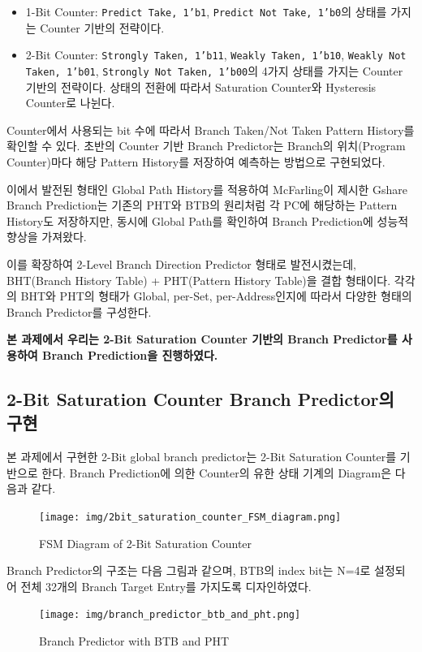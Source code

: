 \documentclass[openright, a4paper]{article}
\newcommand{\code}[1]{\texttt{#1}}
\begin{document}
\begin{itemize}
    \item 1-Bit Counter: \code{Predict Take, 1'b1}, \code{Predict Not Take, 1'b0}의 상태를 가지는 Counter 기반의 전략이다.
    \item 2-Bit Counter: \code{Strongly Taken, 1'b11}, \code{Weakly Taken, 1'b10}, \code{Weakly Not Taken, 1'b01}, \code{Strongly Not Taken, 1'b00}의 4가지 상태를 가지는 Counter 기반의 전략이다. 상태의 전환에 따라서 Saturation Counter와 Hysteresis Counter로 나뉜다.
\end{itemize}

Counter에서 사용되는 bit 수에 따라서 Branch Taken/Not Taken Pattern History를 확인할 수 있다. 초반의 Counter 기반 Branch Predictor는 Branch의 위치(Program Counter)마다 해당 Pattern History를 저장하여 예측하는 방법으로 구현되었다.

이에서 발전된 형태인 Global Path History를 적용하여 McFarling이 제시한 Gshare Branch Prediction는 기존의 PHT와 BTB의 원리처럼 각 PC에 해당하는 Pattern History도 저장하지만, 동시에 Global Path를 확인하여 Branch Prediction에 성능적 향상을 가져왔다.

이를 확장하여 2-Level Branch Direction Predictor 형태로 발전시켰는데, BHT(Branch History Table) + PHT(Pattern History Table)을 결합 형태이다. 각각의 BHT와 PHT의 형태가 Global, per-Set, per-Address인지에 따라서 다양한 형태의 Branch Predictor를 구성한다.

\textbf{본 과제에서 우리는 2-Bit Saturation Counter 기반의 Branch Predictor를 사용하여 Branch Prediction을 진행하였다.}

\subsection{2-Bit Saturation Counter Branch Predictor의 구현}

본 과제에서 구현한 2-Bit global branch predictor는 2-Bit Saturation Counter를 기반으로 한다. Branch Prediction에 의한 Counter의 유한 상태 기계의 Diagram은 다음과 같다.

\begin{figure}[h]
    \centering
    \texttt{[image: img/2bit\_saturation\_counter\_FSM\_diagram.png]}
    \caption{FSM Diagram of 2-Bit Saturation Counter}
\end{figure}

Branch Predictor의 구조는 다음 그림과 같으며, BTB의 index bit는 N=4로 설정되어 전체 32개의 Branch Target Entry를 가지도록 디자인하였다.

\begin{figure}[h]
    \centering
    \texttt{[image: img/branch\_predictor\_btb\_and\_pht.png]}
    \caption{Branch Predictor with BTB and PHT}
\end{figure}
\end{document}
